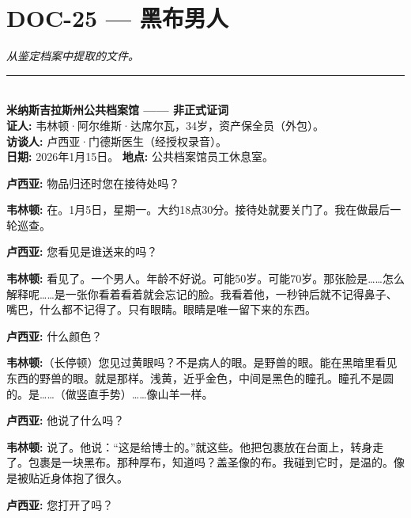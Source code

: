 \section*{\textbf{DOC-25} --- 黑布男人}

\noindent \textit{从鉴定档案中提取的文件。}

\vspace{0.5em}\noindent\rule{\textwidth}{0.5pt}\vspace{0.5em}


\\[-0.2em]

\noindent \textbf{米纳斯吉拉斯州公共档案馆 —— 非正式证词}\\
\noindent \textbf{证人:} 韦林顿·阿尔维斯·达席尔瓦，34岁，资产保全员（外包）。\\
\noindent \textbf{访谈人:} 卢西亚·门德斯医生（经授权录音）。\\
\noindent\textbf{日期:} 2026年1月15日。 \textbf{地点:} 公共档案馆员工休息室。

\noindent \textbf{卢西亚:} 物品归还时您在接待处吗？

\noindent \textbf{韦林顿:} 在。1月5日，星期一。大约18点30分。接待处就要关门了。我在做最后一轮巡查。

\noindent \textbf{卢西亚:} 您看见是谁送来的吗？

\noindent \textbf{韦林顿:} 看见了。一个男人。年龄不好说。可能50岁。可能70岁。那张脸是……怎么解释呢……是一张你看着看着就会忘记的脸。我看着他，一秒钟后就不记得鼻子、嘴巴，什么都不记得了。只有眼睛。眼睛是唯一留下来的东西。

\noindent \textbf{卢西亚:} 什么颜色？

\noindent \textbf{韦林顿:}（长停顿）您见过黄眼吗？不是病人的眼。是野兽的眼。能在黑暗里看见东西的野兽的眼。就是那样。浅黄，近乎金色，中间是黑色的瞳孔。瞳孔不是圆的。是……（做竖直手势）……像山羊一样。

\noindent \textbf{卢西亚:} 他说了什么吗？

\noindent \textbf{韦林顿:} 说了。他说：\textquotedblleft{这是给博士的。\textquotedblright{}}就这些。他把包裹放在台面上，转身走了。包裹是一块黑布。那种厚布，知道吗？盖圣像的布。我碰到它时，是温的。像是被贴近身体抱了很久。

\noindent \textbf{卢西亚:} 您打开了吗？

